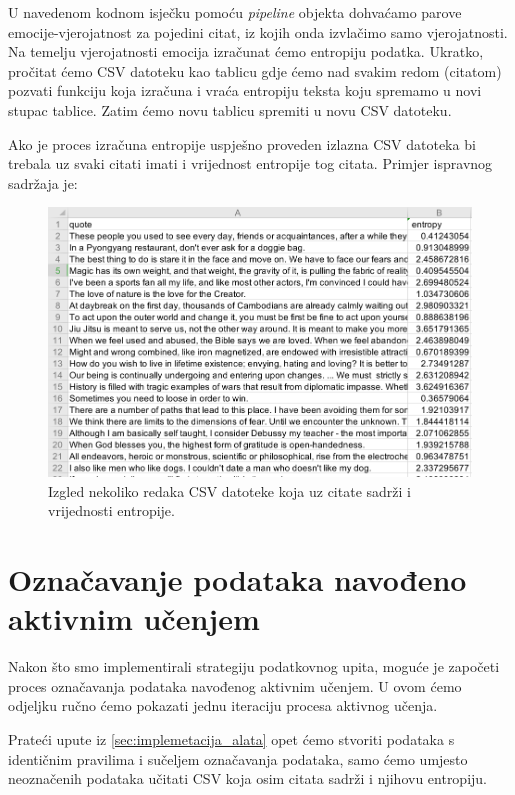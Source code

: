 \documentclass[times, utf8, zavrsni, numeric]{fer}
\begin{document}
U navedenom kodnom isječku pomoću \textit{pipeline} objekta dohvaćamo parove emocije-vjerojatnost za pojedini citat, iz kojih onda izvlačimo samo vjerojatnosti. Na temelju vjerojatnosti emocija izračunat ćemo entropiju podatka.
Ukratko, pročitat ćemo CSV datoteku kao tablicu gdje ćemo nad svakim redom (citatom) pozvati funkciju koja izračuna i vraća entropiju teksta koju spremamo u novi stupac tablice. Zatim ćemo novu tablicu spremiti u novu CSV datoteku.

Ako je proces izračuna entropije uspješno proveden izlazna CSV datoteka bi trebala uz svaki citati imati i vrijednost entropije tog citata.
Primjer ispravnog sadržaja je:

\begin{figure}[H]
    \centering
    \includegraphics[width=\textwidth]{pictures/entropija_csv.png}
    \caption{Izgled nekoliko redaka CSV datoteke koja uz citate sadrži i vrijednosti entropije.}
    \label{entropija_citata}
\end{figure}

\section{Označavanje podataka navođeno aktivnim učenjem}

Nakon što smo implementirali strategiju podatkovnog upita, moguće je započeti proces označavanja podataka navođenog aktivnim učenjem. 
U ovom ćemo odjeljku ručno ćemo pokazati jednu iteraciju procesa aktivnog učenja.

Prateći upute iz \autoref{sec:implemetacija_alata} opet ćemo stvoriti podataka s identičnim pravilima i sučeljem označavanja podataka, samo ćemo umjesto neoznačenih podataka učitati CSV koja osim citata sadrži i njihovu entropiju.
\end{document}

